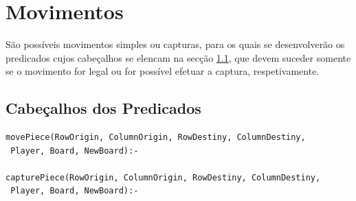 \documentclass[a4paper]{article}
\begin{document}
\section{Movimentos}
São possíveis movimentos simples ou capturas, para os quais se desenvolverão os predicados cujos cabeçalhos se elencam na secção \ref{sec:predicates}, que devem suceder somente se o movimento for legal ou for possível efetuar a captura, respetivamente.

\subsection{Cabeçalhos dos Predicados} \label{sec:predicates}
\begin{verbatim}
movePiece(RowOrigin, ColumnOrigin, RowDestiny, ColumnDestiny,
 Player, Board, NewBoard):-

capturePiece(RowOrigin, ColumnOrigin, RowDestiny, ColumnDestiny,
 Player, Board, NewBoard):-
\end{verbatim}
\end{document}
